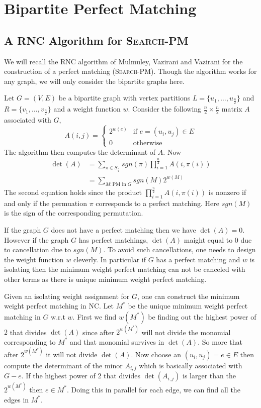 \chapter{Bipartite Perfect Matching}
\section{A \textsc{RNC} Algorithm for \textsc{Search-PM}}\label{rnc-bipartite-pm}
We will recall the \textsc{RNC} algorithm of Mulmuley, Vazirani and Vazirani \cite{MulmuleyVaziraniVazirani_1987_Mia_CONF} for the construction of a perfect matching (\textsc{Search-PM}). Though the algorithm works for any graph, we will only consider the bipartite graphs here.

Let $G=(V,E)$ be a bipartite graph with vertex partitions $L=\{u_1,\dots, u_{\frac{n}{2}}\}$ and $R=\{v_1,\dots, v_{\frac{n}2}\}$ and a weight function $w$. Consider the following $\frac{n}2\times \frac{n}{2}$ matrix $A$ associated with $G$, \[
	A(i,j)=\begin{cases}
		2^{w(e)} & \text{if $e=(u_i,u_j)\in E$} \\
		0        & \text{otherwise}
	\end{cases}
\]
The algorithm then computes the determinant of $A$. Now \begin{align*}
	\det(A) & = \sum\limits_{\pi\in S_{\frac{n }{2}}}^{} sgn(\pi)\prod_{i=1}^{\frac{n }{2}} A(i,\pi(i)) \\ & = \sum\limits_{M:\text{PM in $G$}}^{}sgn(M)2^{w(M)}
\end{align*}
The second equation holds since the product $\prod\limits_{i=1}^{\frac{n}2} A(i,\pi(i))$ is nonzero if and only if the permuation $\pi$ corresponds to a perfect matching. Here $sgn(M)$ is the sign of the corresponding permutation.

If the graph $G$ does not have a perfect matching then we have $\det(A)=0$. However if the graph $G$ has perfect matchings, $\det(A)$ maight equal to 0 due to cancellation due to $sgn(M)$. To avoid such cancellations, one needs to design the weight function $w$ cleverly. In particular if $G$ has a perfect matching and $w$ is isolating then the  minimum weight perfect matching can not be canceled with other terms as there is unique minimum weight perfect matching.

Given an isolating weight assignment for $G$, one can construct the minimum weight perfect matching in \textsc{NC}. Let $M^*$ be the unique minimum weight perfect matching in $G$ w.r.t $w$. First we find $w(M^*)$ be finding out the highest power of $2$ that divides $\det(A)$ since  after $2^{w(M^*)}$ will not divide the monomial corresponding to $M^*$ and that monomial survives in $\det(A)$. So more that after $2^{w(M^*)}$ it will not divide $\det(A)$. Now choose an $(u_i,u_j)=e\in E$ then compute the determinant of the minor $A_{i,j}$ which is basically associated with $G-e$. If the highest power of 2 that divides $\det(A_{i,j})$ is larger than the $2^{w(M^*)}$ then $e\in M^*$. Doing this in parallel for each edge, we can find all the edges in $M^*$.

